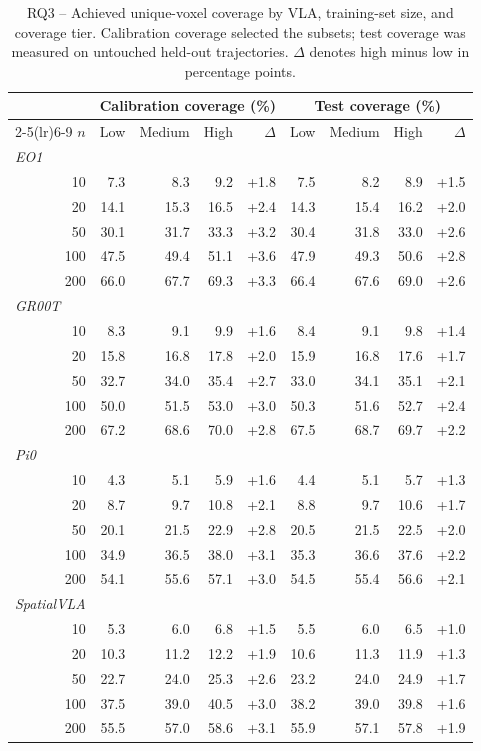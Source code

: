 \begin{table}[t]
\centering
\caption{RQ3 -- Achieved unique-voxel coverage by VLA, training-set size, and coverage tier. Calibration coverage selected the subsets; test coverage was measured on untouched held-out trajectories. $\Delta$ denotes high minus low in percentage points.}
\label{tab:rq3-coverage-manipulation}
{\scriptsize
\setlength{\tabcolsep}{4pt}
\begin{tabular}{rrrrrrrrr}
\toprule
& \multicolumn{4}{c}{Calibration coverage (\%)} & \multicolumn{4}{c}{Test coverage (\%)} \\
\cmidrule(lr){2-5}\cmidrule(lr){6-9}
$n$ & Low & Medium & High & $\Delta$ & Low & Medium & High & $\Delta$ \\
\midrule
\multicolumn{9}{l}{\textit{EO1}} \\
10 & 7.3 & 8.3 & 9.2 & +1.8 & 7.5 & 8.2 & 8.9 & +1.5 \\
20 & 14.1 & 15.3 & 16.5 & +2.4 & 14.3 & 15.4 & 16.2 & +2.0 \\
50 & 30.1 & 31.7 & 33.3 & +3.2 & 30.4 & 31.8 & 33.0 & +2.6 \\
100 & 47.5 & 49.4 & 51.1 & +3.6 & 47.9 & 49.3 & 50.6 & +2.8 \\
200 & 66.0 & 67.7 & 69.3 & +3.3 & 66.4 & 67.6 & 69.0 & +2.6 \\
\midrule
\multicolumn{9}{l}{\textit{GR00T}} \\
10 & 8.3 & 9.1 & 9.9 & +1.6 & 8.4 & 9.1 & 9.8 & +1.4 \\
20 & 15.8 & 16.8 & 17.8 & +2.0 & 15.9 & 16.8 & 17.6 & +1.7 \\
50 & 32.7 & 34.0 & 35.4 & +2.7 & 33.0 & 34.1 & 35.1 & +2.1 \\
100 & 50.0 & 51.5 & 53.0 & +3.0 & 50.3 & 51.6 & 52.7 & +2.4 \\
200 & 67.2 & 68.6 & 70.0 & +2.8 & 67.5 & 68.7 & 69.7 & +2.2 \\
\midrule
\multicolumn{9}{l}{\textit{Pi0}} \\
10 & 4.3 & 5.1 & 5.9 & +1.6 & 4.4 & 5.1 & 5.7 & +1.3 \\
20 & 8.7 & 9.7 & 10.8 & +2.1 & 8.8 & 9.7 & 10.6 & +1.7 \\
50 & 20.1 & 21.5 & 22.9 & +2.8 & 20.5 & 21.5 & 22.5 & +2.0 \\
100 & 34.9 & 36.5 & 38.0 & +3.1 & 35.3 & 36.6 & 37.6 & +2.2 \\
200 & 54.1 & 55.6 & 57.1 & +3.0 & 54.5 & 55.4 & 56.6 & +2.1 \\
\midrule
\multicolumn{9}{l}{\textit{SpatialVLA}} \\
10 & 5.3 & 6.0 & 6.8 & +1.5 & 5.5 & 6.0 & 6.5 & +1.0 \\
20 & 10.3 & 11.2 & 12.2 & +1.9 & 10.6 & 11.3 & 11.9 & +1.3 \\
50 & 22.7 & 24.0 & 25.3 & +2.6 & 23.2 & 24.0 & 24.9 & +1.7 \\
100 & 37.5 & 39.0 & 40.5 & +3.0 & 38.2 & 39.0 & 39.8 & +1.6 \\
200 & 55.5 & 57.0 & 58.6 & +3.1 & 55.9 & 57.1 & 57.8 & +1.9 \\
\bottomrule
\end{tabular}
}
\end{table}

